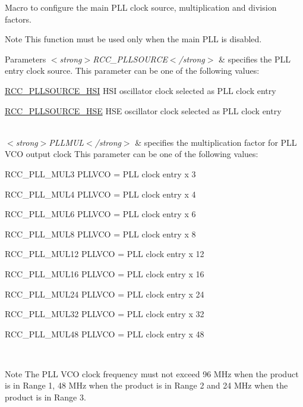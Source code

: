 Macro to configure the main P\-L\-L clock source, multiplication and division factors. 

\begin{DoxyNote}{Note}
This function must be used only when the main P\-L\-L is disabled.
\end{DoxyNote}

\begin{DoxyParams}{Parameters}
{\em $<$strong$>$\-R\-C\-C\-\_\-\-P\-L\-L\-S\-O\-U\-R\-C\-E$<$/strong$>$} & specifies the P\-L\-L entry clock source. This parameter can be one of the following values\-: \begin{DoxyItemize}
\item \hyperlink{group___r_c_c___p_l_l___clock___source_ga0e07703f1ccb3d60f8a47a2dc631c218}{R\-C\-C\-\_\-\-P\-L\-L\-S\-O\-U\-R\-C\-E\-\_\-\-H\-S\-I} H\-S\-I oscillator clock selected as P\-L\-L clock entry \item \hyperlink{group___r_c_c___p_l_l___clock___source_ga197cea7fe5c2db26fe7fcdb0f99dd4d7}{R\-C\-C\-\_\-\-P\-L\-L\-S\-O\-U\-R\-C\-E\-\_\-\-H\-S\-E} H\-S\-E oscillator clock selected as P\-L\-L clock entry \end{DoxyItemize}
\\
\hline
{\em $<$strong$>$\-P\-L\-L\-M\-U\-L$<$/strong$>$} & specifies the multiplication factor for P\-L\-L V\-C\-O output clock This parameter can be one of the following values\-: \begin{DoxyItemize}
\item R\-C\-C\-\_\-\-P\-L\-L\-\_\-\-M\-U\-L3 P\-L\-L\-V\-C\-O = P\-L\-L clock entry x 3 \item R\-C\-C\-\_\-\-P\-L\-L\-\_\-\-M\-U\-L4 P\-L\-L\-V\-C\-O = P\-L\-L clock entry x 4 \item R\-C\-C\-\_\-\-P\-L\-L\-\_\-\-M\-U\-L6 P\-L\-L\-V\-C\-O = P\-L\-L clock entry x 6 \item R\-C\-C\-\_\-\-P\-L\-L\-\_\-\-M\-U\-L8 P\-L\-L\-V\-C\-O = P\-L\-L clock entry x 8 \item R\-C\-C\-\_\-\-P\-L\-L\-\_\-\-M\-U\-L12 P\-L\-L\-V\-C\-O = P\-L\-L clock entry x 12 \item R\-C\-C\-\_\-\-P\-L\-L\-\_\-\-M\-U\-L16 P\-L\-L\-V\-C\-O = P\-L\-L clock entry x 16 \item R\-C\-C\-\_\-\-P\-L\-L\-\_\-\-M\-U\-L24 P\-L\-L\-V\-C\-O = P\-L\-L clock entry x 24 \item R\-C\-C\-\_\-\-P\-L\-L\-\_\-\-M\-U\-L32 P\-L\-L\-V\-C\-O = P\-L\-L clock entry x 32 \item R\-C\-C\-\_\-\-P\-L\-L\-\_\-\-M\-U\-L48 P\-L\-L\-V\-C\-O = P\-L\-L clock entry x 48 \end{DoxyItemize}
\\
\hline
\end{DoxyParams}
\begin{DoxyNote}{Note}
The P\-L\-L V\-C\-O clock frequency must not exceed 96 M\-Hz when the product is in Range 1, 48 M\-Hz when the product is in Range 2 and 24 M\-Hz when the product is in Range 3.
\end{DoxyNote}

